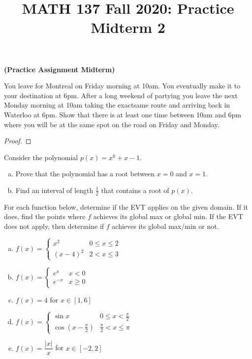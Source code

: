 
\title{MATH 137 Fall 2020: Practice Midterm 2}


\thispagestyle{firstpage}

\textbf{\@title{} (Practice Assignment Midterm)}

\question You leave for Montreal on Friday morning at 10am.
You eventually make it to your destination at 6pm.
After a long weekend of partying you leave the next Monday morning at 10am taking the exactsame route and arriving back in Waterloo at 6pm.
Show that there is at least one time between 10am and 6pm where you will be at the same spot on the road on Friday and Monday.

\begin{proof}

\end{proof}

\question Consider the polynomial $p(x)=x^6+x-1$.
\begin{enumerate}[(a)]
  \item Prove that the polynomial has a root between $x=0$ and $x=1$.
  \item Find an interval of length $\frac{1}{2}$ that contains a root of $p(x)$.
\end{enumerate}

\question For each function below, determine if the EVT applies on the given domain.
If it does, find the points where $f$ achieves its global max or global min.
If the EVT does not apply, then determine if $f$ achieves its global max/min or not.
\begin{enumerate}[(a)]
  \item $f(x)=\begin{cases}
            x^2     & 0 \leq x \leq 2 \\
            (x-4)^2 & 2 < x \leq 3
          \end{cases}$
  \item $f(x)=\begin{cases}
            e^x    & x < 0    \\
            e^{-x} & x \geq 0
          \end{cases}$
  \item $f(x)=4$ for $x \in [1,6]$
  \item $f(x)=\begin{cases}
            \sin x                & 0 \leq x < \frac{\pi}{2}   \\
            \cos(x-\frac{\pi}{2}) & \frac{\pi}{2} < x \leq \pi
          \end{cases}$
  \item $f(x) = \dfrac{|x|}{x}$ for $x \in [-2,2]$
\end{enumerate}

